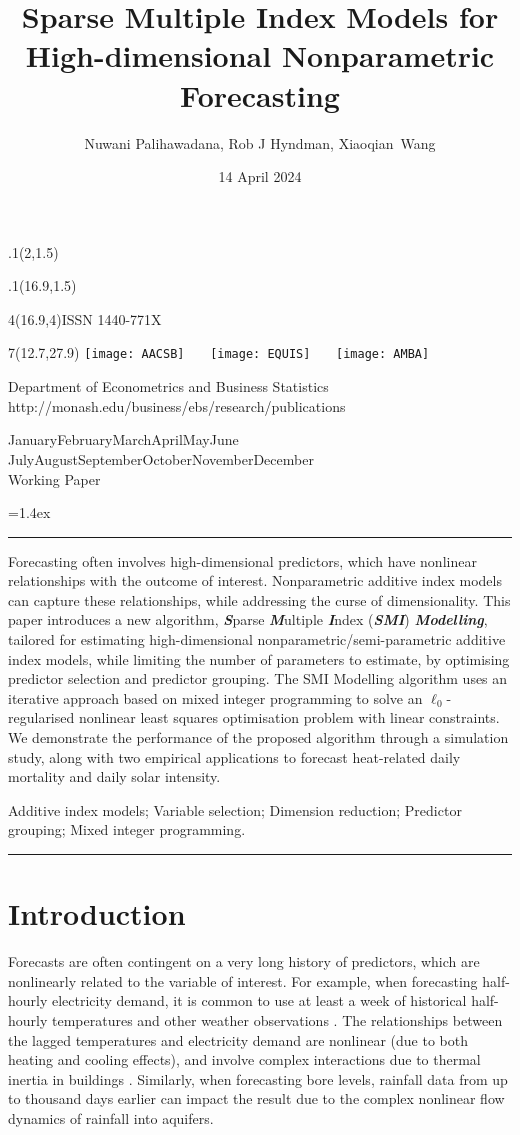 \documentclass[
  11pt,
  a4paper,
]{article}
\title{Sparse Multiple Index Models for High-dimensional Nonparametric
Forecasting}
\date{14 April 2024}
\author{Nuwani Palihawadana, Rob J Hyndman, Xiaoqian~Wang}
\makeatletter
\def\placefig#1#2#3#4{\begin{textblock}{.1}(#1,#2)\rlap{\texttt{[image: \#4]}}\end{textblock}}
\def\Date{\number\day}
\def\Month{\ifcase\month\or
 January\or February\or March\or April\or May\or June\or
 July\or August\or September\or October\or November\or December\fi}
\def\Year{\number\year}
\def\showjel{{\large\textsf{\textbf{JEL classification:}}~\@jel}}
\def\cover{{\sffamily\setcounter{page}{0}
        \thispagestyle{empty}
        \placefig{2}{1.5}{width=5cm}{monash2}
        \placefig{16.9}{1.5}{width=2.1cm}{MBSportrait}
        \begin{textblock}{4}(16.9,4)ISSN 1440-771X\end{textblock}
        \begin{textblock}{7}(12.7,27.9)\hfill
        \texttt{[image: AACSB]}~~~
        \texttt{[image: EQUIS]}~~~
        \texttt{[image: AMBA]}
        \end{textblock}
        \vspace*{2.5cm}
        \begin{center}\Large
        Department of Econometrics and Business Statistics\\[.5cm]
        \footnotesize http://monash.edu/business/ebs/research/publications
        \end{center}\vspace{2cm}
        \begin{center}
        \fbox{\parbox{14cm}{\begin{onehalfspace}\centering\Huge\vspace*{0.3cm}
                \textsf{\textbf{\expandafter{\@title}}}\vspace{1cm}\par
                \LARGE
                \expandafter{\@author}
                \end{onehalfspace}
        }}
        \end{center}
        \vfill
                \begin{center}\Large
                \Month~\Year\\[1cm]
                Working Paper \@wp
        \end{center}\vspace*{2cm}}}
\def\pageone{{\sffamily\setstretch{1}%
        \thispagestyle{empty}%
        \vbox to \textheight{%
        \raggedright\baselineskip=1.2cm
     {\fontsize{24.88}{30}\sffamily\textbf{\expandafter{\@title}}}
        \vspace{2cm}\par
        \hspace{1cm}\parbox{14cm}{\sffamily\large\@addresses}\vspace{1cm}\vfill
        \hspace{1cm}{\large\Date~\Month~\Year}\\[1cm]
        \hspace{1cm}\showjel\vss}}}
\def\blindtitle{{\sffamily
     \thispagestyle{plain}\raggedright\baselineskip=1.2cm
     {\fontsize{24.88}{30}\sffamily\textbf{\expandafter{\@title}}}\vspace{1cm}\par
        }}
\def\titlepage{{\cover\newpage\pageone\newpage\blindtitle}}
\let\maketitle\titlepage
\newenvironment{keywords}{\par\vspace{0.5cm}\noindent{\sffamily\textbf{Keywords:}}}{\vspace{0.25cm}\par\hrule\vspace{0.5cm}\par}
\renewenvironment{abstract}{\begin{minipage}{\textwidth}\parskip=1.4ex\noindent
\hrule\vspace{0.1cm}\par{\sffamily\textbf{\abstractname}}\newline\setstretch{1.5}}
  {\end{minipage}}
\makeatother
\begin{document}
\maketitle

\begin{abstract}
Forecasting often involves high-dimensional predictors, which have
nonlinear relationships with the outcome of interest. Nonparametric
additive index models can capture these relationships, while addressing
the curse of dimensionality. This paper introduces a new algorithm,
\textbf{\emph{S}}parse \textbf{\emph{M}}ultiple \textbf{\emph{I}}ndex
(\textbf{\emph{SMI}}) \textbf{\emph{Modelling}}, tailored for estimating
high-dimensional nonparametric/semi-parametric additive index models,
while limiting the number of parameters to estimate, by optimising
predictor selection and predictor grouping. The SMI Modelling algorithm
uses an iterative approach based on mixed integer programming to solve
an \(\ell_{0}\)-regularised nonlinear least squares optimisation problem
with linear constraints. We demonstrate the performance of the proposed
algorithm through a simulation study, along with two empirical
applications to forecast heat-related daily mortality and daily solar
intensity.
\end{abstract}

\begin{keywords}
  Additive index models; Variable selection; Dimension
reduction; Predictor grouping; 
  Mixed integer programming.
\end{keywords}

\section{Introduction}\label{sec-introduction}

Forecasts are often contingent on a very long history of predictors,
which are nonlinearly related to the variable of interest. For example,
when forecasting half-hourly electricity demand, it is common to use at
least a week of historical half-hourly temperatures and other weather
observations \autocite{HF2010}. The relationships between the lagged
temperatures and electricity demand are nonlinear (due to both heating
and cooling effects), and involve complex interactions due to thermal
inertia in buildings \autocite{FH2012}. Similarly, when forecasting bore
levels, rainfall data from up to thousand days earlier can impact the
result \autocite{Peterson2014,Bakker2019,Rajaee2019} due to the complex
nonlinear flow dynamics of rainfall into aquifers.
\end{document}
